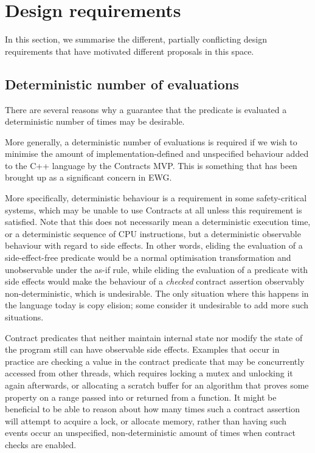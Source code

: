 
\section{Design requirements}
\label{sec:reqs}

In this section, we summarise the different, partially conflicting design requirements that have motivated different proposals in this space.

\subsection{Deterministic number of evaluations}
\label{subsec:determ}
There are several reasons why a guarantee that the predicate is evaluated a deterministic number of times may be desirable.

More generally, a deterministic number of evaluations is required if we wish to minimise the amount of implementation-defined and unspecified behaviour added to the C++ language by the Contracts MVP. This is something that has been brought up as a significant concern in EWG.

More specifically, deterministic behaviour is a requirement in some safety-critical systems, which may be unable to use Contracts at all unless this requirement is satisfied. Note that this does not necessarily mean a deterministic execution time, or a deterministic sequence of CPU instructions, but a deterministic observable behaviour with regard to side effects. In other words, eliding the evaluation of a side-effect-free predicate would be a normal optimisation transformation and unobservable under the as-if rule, while eliding the evaluation of a predicate with side effects would make the behaviour of a \emph{checked} contract assertion observably non-deterministic, which is undesirable. The only situation where this happens in the language today is copy elision; some consider it undesirable to add more such situations.

Contract predicates that neither maintain internal state nor modify the state of the program still can have observable side effects. Examples that occur in practice are checking a value in the contract predicate that may be concurrently accessed from other threads, which requires locking a mutex and unlocking it again afterwards, or allocating a scratch buffer for an algorithm that proves some property on a range passed into or returned from a function. It might be beneficial to be able to reason about how many times such a contract assertion will attempt to acquire a lock, or allocate memory, rather than having such events occur an unspecified, non-deterministic amount of times when contract checks are enabled.

